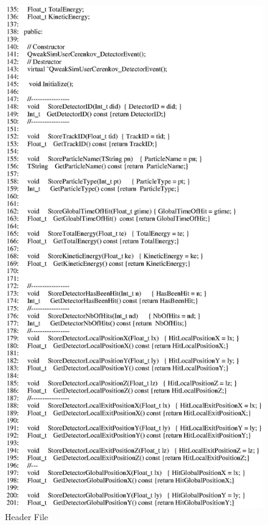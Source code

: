 \clearpage

\begin{figure}[ht]
  \hspace{0cm}
  \includegraphics[scale=0.8]{./figures5/QweakSimUserCerenkov_DetectorEvent.hh-p3.eps}
  \caption{\label{SourceV33} Header File}
           \label{fig:V-SC-36}
\end{figure}

